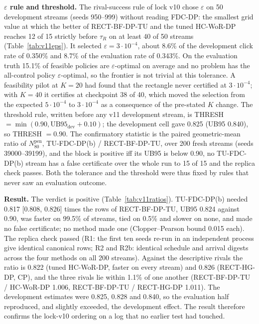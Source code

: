 \documentclass[sigconf,anonymous,review]{acmart}
\newcommand{\eps}{\varepsilon}
\newcommand{\Npen}{N_{80}^{\text{pen}}}
\begin{document}
\textbf{$\eps$ rule and threshold.} The rival-success rule of lock v10 chose $\eps$ on 50 development streams (seeds 950--999) without reading FDC-DP: the smallest grid value at which the better of RECT-BF-DP-TU and the tuned HC-WoR-DP reaches 12 of 15 strictly before $\tau_R$ on at least 40 of 50 streams (Table~\ref{tab:v11eps}). It selected $\eps = 3\cdot 10^{-4}$, about 8.6\% of the development click rate of 0.350\% and 8.7\% of the evaluation rate of 0.343\%. On the evaluation truth 15.1\% of feasible policies are $\eps$-optimal on average and no problem has the all-control policy $\eps$-optimal, so the frontier is not trivial at this tolerance. A feasibility pilot at $K = 20$ had found that the rectangle never certified at $3\cdot 10^{-4}$; with $K = 40$ it certifies at checkpoint 38 of 40, which moved the selection from the expected $5\cdot 10^{-4}$ to $3\cdot 10^{-4}$ as a consequence of the pre-stated $K$ change. The threshold rule, written before any v11 development stream, is THRESH $= \min(0.90, \mathrm{UB95}_{\text{dev}} + 0.10)$; the development cell gave 0.825 (UB95 0.840), so THRESH $= 0.90$. The confirmatory statistic is the paired geometric-mean ratio of $\Npen$, TU-FDC-DP(b) / RECT-BF-DP-TU, over 200 fresh streams (seeds 39000--39199), and the block is positive iff its UB95 is below 0.90, no TU-FDC-DP(b) stream has a false certificate over the whole run to 15 of 15 and the replica check passes. Both the tolerance and the threshold were thus fixed by rules that never saw an evaluation outcome.



\textbf{Result.} The verdict is positive (Table~\ref{tab:v11ratios}). TU-FDC-DP(b) needed 0.817 [0.808, 0.826] times the rows of RECT-BF-DP-TU, UB95 0.824 against 0.90, was faster on 99.5\% of streams, tied on 0.5\% and slower on none, and made no false certificate; no method made one (Clopper--Pearson bound 0.015 each). The replica check passed (R1: the first ten seeds re-run in an independent process give identical canonical rows; R2 and R2b: identical schedule and arrival digests across the four methods on all 200 streams). Against the descriptive rivals the ratio is 0.822 (tuned HC-WoR-DP, faster on every stream) and 0.826 (RECT-HG-DP, CP), and the three rivals lie within 1.1\% of one another (RECT-BF-DP-TU / HC-WoR-DP 1.006, RECT-BF-DP-TU / RECT-HG-DP 1.011). The development estimates were 0.825, 0.828 and 0.840, so the evaluation half reproduced, and slightly exceeded, the development effect. The result therefore confirms the lock-v10 ordering on a log that no earlier test had touched.
\end{document}
